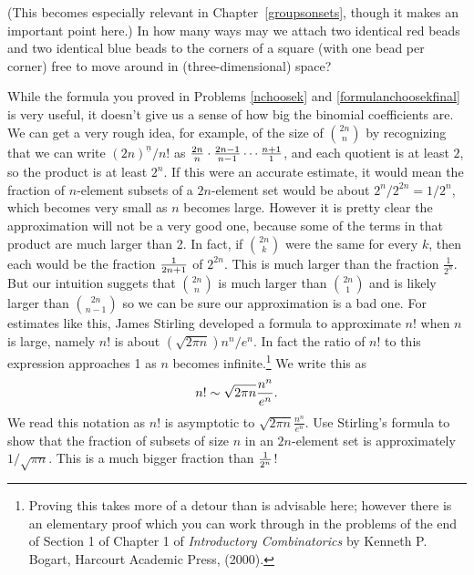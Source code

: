 \iteme (This becomes especially relevant in
Chapter~\ref{groupsonsets}, though it makes an important point here.) In how many ways may we attach two identical red beads
and two identical blue beads to the corners of a square (with one bead
per corner) free
to move around in (three-dimensional) space? \label{twocolorsofbeads}

\itemi While the formula you proved in Problems \ref{nchoosek} and
\ref{formulanchoosekfinal} is very useful,
it doesn't give us a sense of how big the binomial coefficients are.  We can
get a very rough idea, for example, of the size of $2n\choose n$ by
recognizing that we can write $(2n)^{\underline{n}}/n!$ as ${2n\over n}\cdot
{2n-1\over n-1}\cdots {n+1\over 1}$, and each quotient is at least $2$, so the
product is at least $2^n$.  If this were an accurate estimate, it would mean
the fraction of $n$-element subsets of a $2n$-element set would be
about
$2^n/2^{2n}=1/2^n$, which becomes very small as $n$ becomes large. 
However it is pretty clear the approximation will not be a very good one,
because some of the terms in that product are much larger than 2.  In fact,
if $2n\choose k$ were the same for every $k$, then each would be the fraction
$1\over 2n+1$ of $2^{2n}$. This is much larger than the fraction
$\frac{1}{2^n}$. But our intuition suggets that $\binom{2n}{n}$ is
much larger than $\binom{2n}{1}$ and is likely larger than
$\binom{2n}{n-1}$ so we can be sure our approximation is a bad one. For estimates like
this, James Stirling developed a formula to approximate
$n!$  when $n$ is large, namely $n!$ is about $ \left(\sqrt{2\pi
n}\right){n^n/ e^n}$.  In fact the ratio of
$n!$ to this expression approaches 1 as
$n$ becomes infinite.\footnote{Proving this takes more of a detour than is
advisable here; however there is an elementary proof which you can work
through in the problems of the end of Section 1 of Chapter 1 of {\em
Introductory Combinatorics} by Kenneth P. Bogart, Harcourt Academic Press,
(2000).}  We write this as $$n!\sim \sqrt{2\pi
n}{n^n\over e^n}.$$  We read this notation as $n!$ is asymptotic to
$\sqrt{2\pi n}\frac{n^n}{e^n}$. Use Stirling's formula to show that the fraction of 
subsets of size
$n$ in an
$2n$-element set is approximately $1/\sqrt{\pi n}$.  This is a much bigger
fraction than $1\over 2^n$!\label{Stirling'sapproximation}
\ep 



